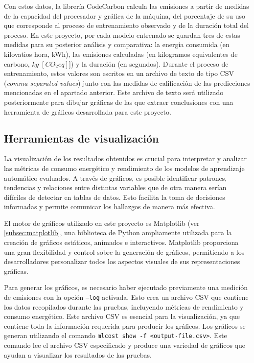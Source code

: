 Con estos datos, la librería CodeCarbon calcula las emisiones a partir de medidas de la capacidad del procesador y gráfica de la máquina, del porcentaje de su uso que corresponde al proceso de entrenamiento observado y de la duración total del proceso. En este proyecto, por cada modelo entrenado se guardan tres de estas medidas para su posterior análisis y comparativa: la energía consumida (en kilovatios hora, \unit{kWh}), las emisiones calculadas (en kilogramos equivalentes de carbono, $\unit{kg\;[CO_2eq]}$]) y la duración (en segundos). Durante el proceso de entrenamiento, estos valores son escritos en un archivo de texto de tipo CSV (\emph{comma-separated values}) junto con las medidas de calificación de las predicciones mencionadas en el apartado anterior. Este archivo de texto será utilizado posteriormente para dibujar gráficas de las que extraer conclusiones con una herramienta de gráficos desarrollada para este proyecto.


\subsection{Herramientas de visualización}

La visualización de los resultados obtenidos es crucial para interpretar y analizar las métricas de consumo energético y rendimiento de los modelos de aprendizaje automático evaluados. A través de gráficos, es posible identificar patrones, tendencias y relaciones entre distintas variables que de otra manera serían difíciles de detectar en tablas de datos. Esto facilita la toma de decisiones informadas y permite comunicar los hallazgos de manera más efectiva.

El motor de gráficos utilizado en este proyecto es Matplotlib (ver \ref{subsec:matplotlib}, una biblioteca de Python ampliamente utilizada para la creación de gráficos estáticos, animados e interactivos. Matplotlib proporciona una gran flexibilidad y control sobre la generación de gráficos, permitiendo a los desarrolladores personalizar todos los aspectos visuales de sus representaciones gráficas.

Para generar los gráficos, es necesario haber ejecutado previamente una medición de emisiones con la opción \texttt{--log} activada. Esto crea un archivo CSV que contiene los datos recopilados durante las pruebas, incluyendo métricas de rendimiento y consumo energético. Este archivo CSV es esencial para la visualización, ya que contiene toda la información requerida para producir los gráficos. Los gráficos se generan utilizando el comando \texttt{mlcost show -f <output-file.csv>}. Este comando lee el archivo CSV especificado y produce una variedad de gráficos que ayudan a visualizar los resultados de las pruebas.


